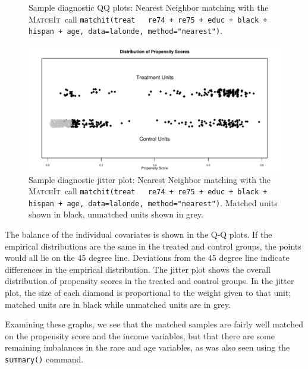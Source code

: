 \documentclass[oneside,letterpaper,titlepage]{article}
\newcommand{\MatchIt}{\textsc{MatchIt}}
\begin{document}
\begin{enumerate}
\begin{figure}[tbp]
\begin{center}
    \hfill
    \caption{Sample diagnostic QQ plots: Nearest Neighbor matching
      with the \MatchIt\ call \texttt{matchit(treat ~ re74 + re75 + educ
        + black + hispan + age, data=lalonde, method="nearest")}.}
    \label{diagqqnn}
  \end{center}
\end{figure}

\begin{figure}[tbp]
  \begin{center}
    \includegraphics[scale=0.5]{figs/jitterplotnn}
    \hfill
    \caption{Sample diagnostic jitter plot: Nearest Neighbor matching
      with the \MatchIt\ call \texttt{matchit(treat ~ re74 + re75 +
        educ + black + hispan + age, data=lalonde, method="nearest")}.
      Matched units shown in black, unmatched units shown in grey.}
    \label{diagjitternn}
  \end{center}
\end{figure}

The balance of the individual covariates is shown in the Q-Q plots.
If the empirical distributions are the same in the treated and control
groups, the points would all lie on the 45 degree line.  Deviations
from the 45 degree line indicate differences in the empirical
distribution.  The jitter plot shows the overall distribution of
propensity scores in the treated and control groups.  In the jitter
plot, the size of each diamond is proportional to the weight given to
that unit; matched units are in black while unmatched units are in
grey.

Examining these graphs, we see that the matched samples are fairly
well matched on the propensity score and the income variables, but
that there are some remaining imbalances in the race and age
variables, as was also seen using the \texttt{summary()} command.


\end{enumerate}
\end{document}
